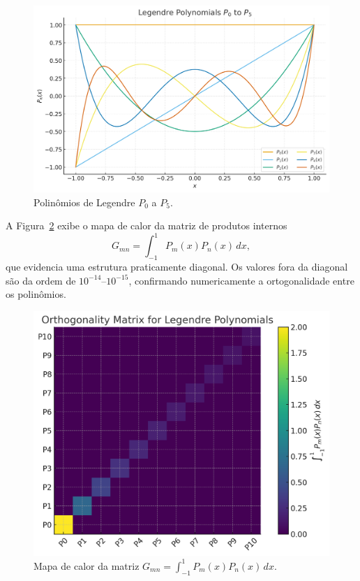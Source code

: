 \documentclass[12pt,a4paper]{article}
\begin{document}
\begin{figure}[H]
  \centering
  \includegraphics[width=0.85\linewidth]{figures/legendre_polynomials.png}
  \caption{Polinômios de Legendre \(P_0\) a \(P_5\).}
  \label{fig:legendre_polys}
\end{figure}

A Figura~\ref{fig:legendre_gram} exibe o mapa de calor da matriz de produtos internos
\[
G_{mn} = \int_{-1}^{1} P_m(x)P_n(x)\,dx,
\]
que evidencia uma estrutura praticamente diagonal.  
Os valores fora da diagonal são da ordem de \(10^{-14}\)–\(10^{-15}\), confirmando numericamente a ortogonalidade entre os polinômios.

\begin{figure}[H]
  \centering
  \includegraphics[width=0.85\linewidth]{figures/legendre_orthogonality_matrix.png}
  \caption{Mapa de calor da matriz \(G_{mn}=\int_{-1}^{1} P_m(x)P_n(x)\,dx\).}
  \label{fig:legendre_gram}
\end{figure}
\end{document}
